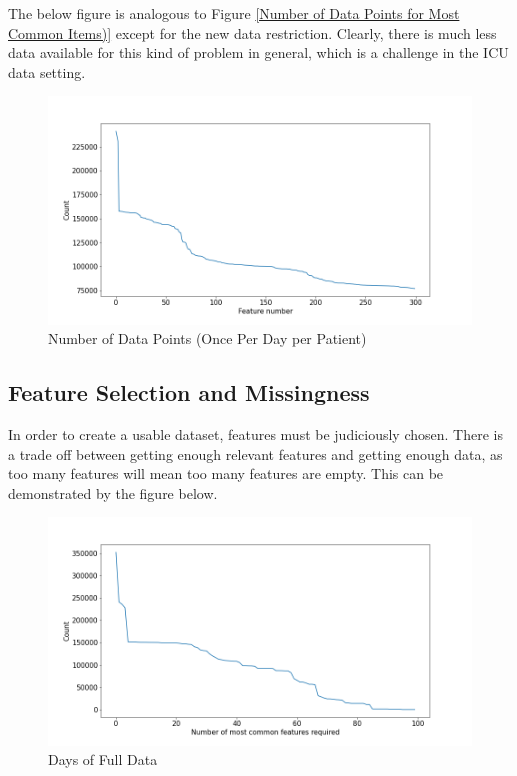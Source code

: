 \documentclass[12pt]{article}
\begin{document}
The below figure is analogous to Figure \ref{Number of Data Points for Most Common Items)} except for the new data restriction. Clearly, there is much less data available for this kind of problem in general, which is a challenge in the ICU data setting.

\begin{figure}[H]
\centering\caption{Number of Data Points (Once Per Day per Patient)}
\includegraphics[scale=0.5]{Number of Data Points (Once Per Day per Patient).png}
\end{figure}

\subsection{Feature Selection and Missingness}

In order to create a usable dataset, features must be judiciously chosen. There is a trade off between getting enough relevant features and getting enough data, as too many features will mean too many features are empty. This can be demonstrated by the figure below.

\begin{figure}[H]
\centering\caption{Days of Full Data}
\includegraphics[scale=0.65]{Days of Full Data.png}
\end{figure}
\end{document}
